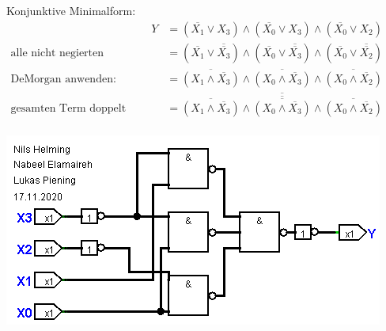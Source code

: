 \documentclass[]{article}
\newcommand{\V}{\lor}
\newcommand{\A}{\land}
\newcommand{\T}[1]{\overline{#1}}
\begin{document}
	\begin{samepage}
	Konjunktive Minimalform:
	\begin{align*}
		&& Y &= (\T{X_1} \V X_3) \A (\T{X_0} \V X_3) \A (\T{X_0} \V X_2) &&\\
		\text{alle nicht negierten Eingänge doppelt negieren:}&& &= (\T{X_1} \V \T{\T{X_3}}) \A (\T{X_0} \V \T{\T{X_3}}) \A (\T{X_0} \V \T{\T{X_2}}) &&\\
		\text{DeMorgan anwenden:}&& &= \T{(X_1 \A \T{X_3})} \A \T{(X_0 \A \T{X_3})} \A \T{(X_0 \A \T{X_2})} &&\\
		\text{gesamten Term doppelt negieren:}&& &= \T{\T{\T{(X_1 \A \T{X_3})} \A \T{(X_0 \A \T{X_3})} \A \T{(X_0 \A \T{X_2})}}} &&\\
	\end{align*}
	\begin{center}\includegraphics[scale=0.7]{Bilder/KonjunktiveNormalform.png}\end{center}
	\end{samepage}
\end{document}
